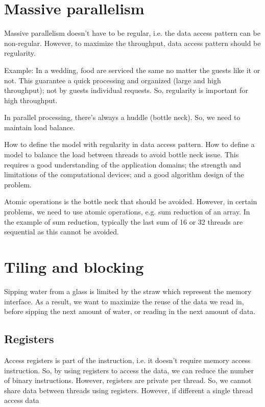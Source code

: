 \section{Massive parallelism}
\label{sec:massive-parallelism}

Massive parallelism doesn't have to be regular, i.e. the data access
pattern can be non-regular. However, to maximize the throughput, data
access pattern should be regularity.

Example: In a wedding, food are serviced the same no matter the guests
like it or not. This guarantee a quick processing and organized (large
and high throughput); not by guests individual requests. So,
regularity is important for high throughput. 

In parallel processing, there's always a huddle (bottle neck). So, we
need to maintain load balance.


How to define the model with regularity in data access pattern. How to
define a model to balance the load between threads to avoid bottle
neck issue. This requires a good understanding of the application
domains; the strength and limitations of the computational devices;
and a good algorithm design of the problem.

Atomic operations is the bottle neck that should be avoided. However,
in certain problems, we need to use atomic operations, e.g. sum
reduction of an array. In the example of sum reduction, typically the
last sum of 16 or 32 threads are sequential as this cannot be
avoided. 

\section{Tiling and blocking}
\label{sec:tiling-blocking}

Sipping water from a glass is limited by the straw which represent the
memory interface. As a result, we want to maximize the reuse of the
data we read in, before sipping the next amount of water, or reading
in the next amount of data. 


\subsection{Registers}
\label{sec:registers}

Access registers is part of the instruction, i.e. it doesn't require
memory access instruction. So, by using registers to access the data,
we can reduce the number of binary instructions. However, registers
are private per thread. So, we cannot share data between threads using
registers. However, if different a single thread access data 



